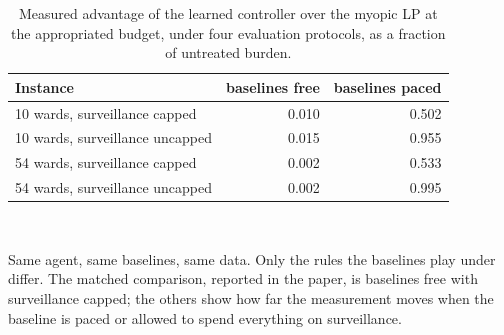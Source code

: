 \begin{table}[htbp]
\centering\small
\caption{Measured advantage of the learned controller over the myopic LP at the appropriated budget, under four evaluation protocols, as a fraction of untreated burden.}
\label{tab:protocol_matrix}
\begin{tabular}{lrr}
\toprule
Instance & baselines free & baselines paced \\
\midrule
10 wards, surveillance capped & 0.010 & 0.502 \\
10 wards, surveillance uncapped & 0.015 & 0.955 \\
54 wards, surveillance capped & 0.002 & 0.533 \\
54 wards, surveillance uncapped & 0.002 & 0.995 \\
\bottomrule
\end{tabular}
\\[2pt]\parbox{0.92\textwidth}{\footnotesize Same agent, same baselines, same data. Only the rules the baselines play under differ. The matched comparison, reported in the paper, is baselines free with surveillance capped; the others show how far the measurement moves when the baseline is paced or allowed to spend everything on surveillance.}
\end{table}
